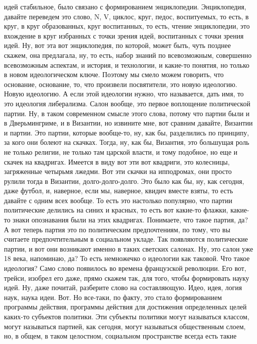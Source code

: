 идей стабильное, было связано с формированием энциклопедии. Энциклопедия,
давайте переведем это слово, N, V, циклос, круг, педос, воспитуемых, то есть, в
круг, в круг образованных, круг воспитанных, то есть, чтение энциклопедии, это
вхождение в круг избранных с точки зрения идей, воспитанных с точки зрения идей.
Ну, вот эта вот энциклопедия, по которой, может быть, чуть позднее скажем, она
предлагала, ну, то есть, набор знаний по всевозможным, совершенно всевозможным
аспектам, и история, и технологии, и какие-то понятия, но только в новом
идеологическом ключе. Поэтому мы смело можем говорить, что основание, основание,
то, что произвели посвятители, это новую идеологию. Новую идеологию. А если этой
идеологии нужно, что называется, дать имя, то это идеология либерализма. Салон
вообще, это первое воплощение политической партии. Ну, в таком современном
смысле этого слова, потому что партии были и в Дверьмингриме, и в Византии, но
извините мне, вот сравним давайте, Византии и партии. Это партии, которые
вообще-то, ну, как бы, разделились по принципу, за кого они болеют на скачках.
Тогда, ну, как бы, Византия, это большущая роль не только религии, не только там
царской власти, и тому подобное, но еще и скачек на квадригах. Имеется в виду
вот эти вот квадриги, это колесницы, загряженные четырьмя лжедми. Вот эти скачки
на ипподромах, они просто рулили тогда в Византии, долго-долго-долго. Это было
как бы, ну, как сегодня, даже футбол, и, наверное, если мы, наверное, квидич
вместе взяты, то есть давайте с одним всех вообще. То есть это настолько
популярно, что партии политические делились на синих и красных, то есть вот
какие-то флажки, какие-то знаки опознавания были на этих квадригах. Понимаете,
что такое партия, да? А вот теперь партия это по политическим предпочтениям, по
тому, что вы считаете предпочтительным в социальном укладе. Так появляются
политические партии, и вот они возникают именно в таких светских салонах. Ну,
это салон уже 18 века, напоминаю, да? То есть немножечко о идеологии как
таковой. Что такое идеология? Само слово появилось во времена французской
революции. Его вот, трейси, изобрел его даже, прямо скажем так, для того, чтобы
формировать науку идей. Ну, даже почитай, разберите слово на составляющую. Идео,
идея, логия наук, наука идеи. Вот. Но все-таки, по факту, это стало
формированием программы действия, программы действия для достижения определенных
целей каких-то субъектов политики. Эти субъекты политики могут называться
классом, могут называться партией, как сегодня, могут называться общественным
слоем, но, в общем, в таком целостном, социальном пространстве всегда есть такие
